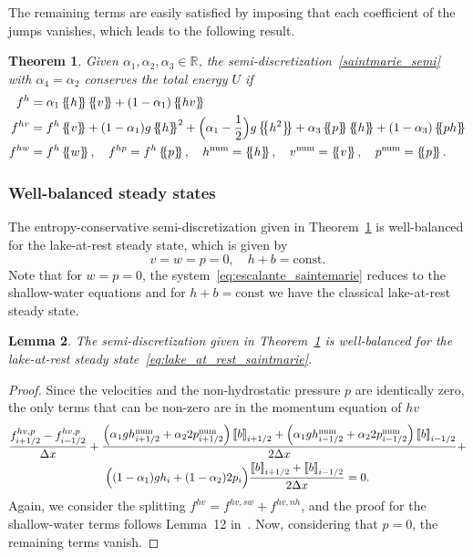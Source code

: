 \documentclass[]{scrartcl}
\newcommand*{\ldblbrace}{\{\mskip-5mu \left \{}
\newcommand*{\rdblbrace}{ \}\mskip-5mu \right \}}
\newcommand{\mean}[1]{\left\ldblbrace #1 \right\rdblbrace}
\newcommand{\jump}[1]{\left\llbracket #1  \right\rrbracket}
\newtheorem{theorem}{Theorem}[section]
\newtheorem{lemma}[theorem]{Lemma}
\theoremstyle{definition}
\begin{document}
The remaining terms are easily satisfied by imposing that each coefficient of the jumps vanishes, which leads to the following result.
\begin{theorem}
\label{th:ec_saintmarie}
   Given $\alpha_1, \alpha_2, \alpha_3 \in \mathbb{R}$, the semi-discretization~\eqref{saintmarie_semi} with $\alpha_4 = \alpha_2$ conserves the total energy $U$ if
\begin{equation}
    \label{eq:ec_saintmarie_flux}
    \begin{aligned}
        f^h &= \alpha_1 \mean{h} \mean{v} + (1-\alpha_1) \mean{hv} \\
        f^{hv} &= f^h \mean{v} + (1-\alpha_1)g \mean{h}^2 + \Bigl (\alpha_1 - \frac{1}{2} \Bigr ) g \mean{h^2} + \alpha_3 \mean{p}\mean{h} + (1-\alpha_3) \mean{ph}\\
        f^{hw} &= f^h \mean{w}, \quad
        f^{hp} = f^h \mean{p}, \quad
        h^{\mathrm{num}} = \mean{h}, \quad
        v^{\mathrm{num}} = \mean{v}, \quad
        p^{\mathrm{num}} = \mean{p}.
    \end{aligned}
\end{equation}
\end{theorem}

\subsubsection{Well-balanced steady states}
The entropy-conservative semi-discretization given in Theorem~\ref{th:ec_saintmarie} is well-balanced for the lake-at-rest steady state, which is given by
\begin{equation}\label{eq:lake_at_rest_saintmarie}
v = w = p = 0, \quad h + b = \text{const}.
\end{equation}
Note that for $w = p = 0$, the system~\eqref{eq:escalante_saintemarie} reduces to the shallow-water equations and for $h+b=\text{const}$ we have the classical lake-at-rest steady state.
\begin{lemma}\label{lemma_wb_saintemarie}
The semi-discretization given in Theorem~\ref{th:ec_saintmarie} is well-balanced for the lake-at-rest steady state~\eqref{eq:lake_at_rest_saintmarie}.
\end{lemma}
\begin{proof}
Since the velocities and the non-hydrostatic pressure $p$ are identically zero, the only terms that can be non-zero are in the momentum equation of $hv$
\begin{multline}
\frac{f^{hv,p}_{i+1/2} - f^{hv,p}_{i-1/2}}{\Delta x} + \frac{\left (\alpha_1 gh^{\mathrm{num}}_{i+1/2} + \alpha_2 2 p^{\mathrm{num}}_{i+1/2}\right )\jump{b}_{i+1/2} + \left (\alpha_1 gh^{\mathrm{num}}_{i-1/2} + \alpha_2 2 p^{\mathrm{num}}_{i-1/2}\right )\jump{b}_{i-1/2}}{2\Delta x}+ \\
\Bigl ((1-\alpha_1)g h_i + (1-\alpha_2) 2 p_i \Bigr ) \frac{\jump{b}_{i+1/2} + \jump{b}_{i-1/2}}{2\Delta x} = 0.
\end{multline}
Again, we consider the splitting $f^{hv} = f^{hv,sw} + f^{hv,nh}$, and the proof for the shallow-water terms follows Lemma~12 in~\cite{Ranocha2017}. Now, considering that $p = 0$, the remaining terms vanish.
\end{proof}
\end{document}
